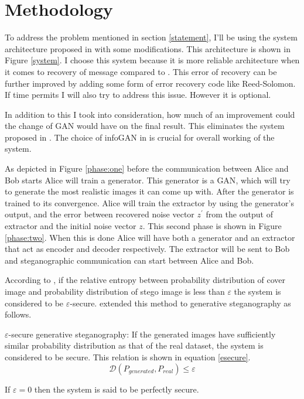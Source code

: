 \documentclass[../main/main.tex]{subfiles}
\begin{document}
	
	\section{ Methodology}
	To address the problem mentioned in section \ref{statement}, I'll be using the system architecture proposed in \cite{Hu2018} with some modifications. This architecture is shown in Figure \ref{system}. I choose this system because it is more reliable architecture when it comes to recovery of message  compared to \cite{Zhang2019}. This error of recovery can be further improved by adding some form of error recovery code like Reed-Solomon. If time permits I will also try to address this issue. However it is optional. 
	
	In addition to this I took into consideration, how much of an improvement could the change of \gls{GAN} would have on the final result. This eliminates the system proposed in \cite{Ke}. The choice of \gls{infoGAN} in \cite{Ke} is crucial for overall working of the system. 
	
	As depicted in Figure \ref{phase:one} before the communication between Alice and Bob starts Alice will train a generator. This generator is a \gls{GAN}, which will try to generate the most realistic images it can come up with.
	After the generator is trained to its convergence. Alice will train the extractor by using the generator's output, and the error between recovered noise vector $z^\prime$ from the output of extractor and the initial noise vector $z$. This second phase is shown in Figure \ref{phase:two}. When this is done Alice will have both a generator and an extractor that act as  encoder and  decoder respectively. The extractor will be sent to Bob and steganographic communication can start between Alice and Bob.
	
	According to \cite{Cachin1998},  if the relative entropy between  probability distribution of  cover image and probability distribution of stego image is less than $\varepsilon$ the system is considered to be $\varepsilon$-secure. \cite{Zhang2019} extended this method to generative steganography as follows. 
		
	\theoremstyle{definition}
	\begin{definition}{$\varepsilon$-secure generative steganography: }
		If the generated images have sufficiently similar probability distribution as that of the real dataset,  the system is considered to be secure. This relation is shown in equation \ref{esecure}.
		\begin{equation} \label{esecure}
		\mathcal{D}(P_{generated},P_{real}) \leq \varepsilon
		\end{equation}
		
		If $\varepsilon=0$ then the system is said to be perfectly secure. 
	\end{definition}
\end{document}
